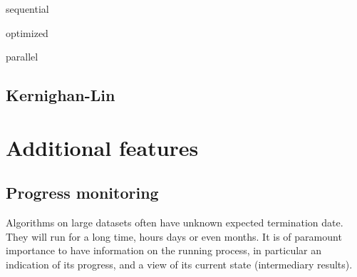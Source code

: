 \documentclass[11pt,a4paper]{article}
\begin{document}
sequential

optimized

parallel

\subsection{Kernighan-Lin}



\section{Additional features}

\subsection{Progress monitoring}

Algorithms on large datasets often have unknown expected termination date. They will run for a long time, hours days or even months. It is of paramount importance to have information on the running process, in particular an indication of its progress, and a view of its current state (intermediary results).
\end{document}
